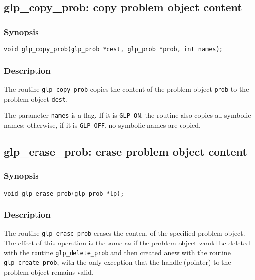 \subsection{glp\_copy\_prob: copy problem object content}

\subsubsection*{Synopsis}

\begin{verbatim}
void glp_copy_prob(glp_prob *dest, glp_prob *prob, int names);
\end{verbatim}

\subsubsection*{Description}

The routine \verb|glp_copy_prob| copies the content of the problem
object \verb|prob| to the problem object \verb|dest|.

The parameter \verb|names| is a flag. If it is \verb|GLP_ON|,
the routine also copies all symbolic names; otherwise, if it is
\verb|GLP_OFF|, no symbolic names are copied.

\subsection{glp\_erase\_prob: erase problem object content}

\subsubsection*{Synopsis}

\begin{verbatim}
void glp_erase_prob(glp_prob *lp);
\end{verbatim}

\subsubsection*{Description}

The routine \verb|glp_erase_prob| erases the content of the specified
problem object. The effect of this operation is the same as if the
problem object would be deleted with the routine \verb|glp_delete_prob|
and then created anew with the routine \verb|glp_create_prob|, with the
only exception that the handle (pointer) to the problem object remains
valid.


